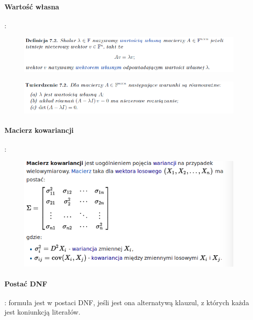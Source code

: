\documentclass[10pt,a4paper]{article}
\begin{document}
\paragraph{Wartość własna} :
  \begin{figure}[H]
    \centering
      \includegraphics[scale=0.50]{images/wartosc.png}
  \end{figure}
  \begin{figure}[H]
    \centering
      \includegraphics[scale=0.50]{images/wartosc2.png}
  \end{figure}
\paragraph{Macierz kowariancji} :
\begin{figure}[H]
  \centering
    \includegraphics[scale=0.50]{images/cov.png}
\end{figure}
\paragraph{Postać DNF} : formuła jest w postaci DNF, jeśli jest ona alternatywą klauzul, z których każda jest koniunkcją literałów.
\end{document}
